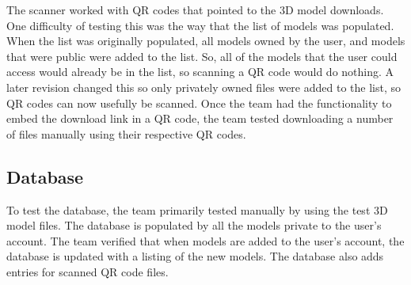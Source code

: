         The scanner worked with QR codes that pointed to the 3D model downloads.  One difficulty of testing this was the way that the list of models was populated.  When the list was originally populated, all models owned by the user, and models that were public were added to the list.  So, all of the models that the user could access would already be in the list, so scanning a QR code would do nothing.  A later revision changed this so only privately owned files were added to the list, so QR codes can now usefully be scanned. Once the team had the functionality to embed the download link in a QR code, the team tested downloading a number of files manually using their respective QR codes.

    \subsection{Database}
        
        To test the database, the team primarily tested manually by using the test 3D model files. The database is populated by all the models private to the user's account. The team verified that when models are added to the user's account, the database is updated with a listing of the new models. The database also adds entries for scanned QR code files.